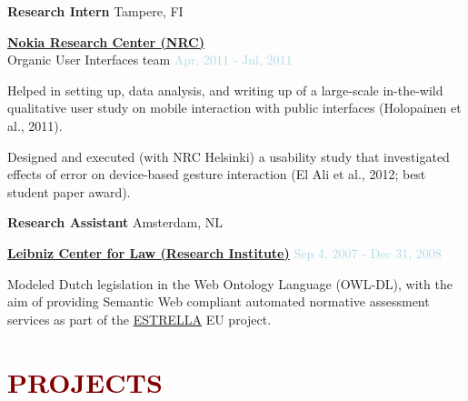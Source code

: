 \documentclass{article}
\newenvironment{outerlist}[1][\enskip\textbullet]%
        {\begin{enumerate}[#1]}{\end{enumerate}%
         \vspace{-.6\baselineskip}}
\newenvironment{innerlist}[1][\enskip\textbullet]%
        {\begin{compactenum}[#1]}{\end{compactenum}}
\begin{document}
\medskip
\textbf{Research Intern}
 \hfill {Tampere, FI}   

\begin{outerlist}

\item[] \href{http://research.nokia.com/}{\textbf{Nokia Research Center (NRC)}} \\ Organic User Interfaces team%
 	   \hfill {\textcolor{lightblue}{Apr, 2011 - Jul, 2011}}
	   
\medskip

\begin{innerlist}[-]

\item Helped in setting up, data analysis, and writing up of a large-scale in-the-wild qualitative user study on mobile interaction with public interfaces (Holopainen et al., 2011).
\item Designed and executed (with NRC Helsinki) a usability study that investigated effects of error on device-based gesture interaction (El Ali et al., 2012; best student paper award).

\end{innerlist}

\end{outerlist}



\medskip

\textbf{Research Assistant}
 \hfill {Amsterdam, NL}
\begin{outerlist}

\item[]  \href{http://www.leibnizcenter.org/}{\textbf{Leibniz Center for Law (Research Institute)}} \hfill {\textcolor{lightblue}{Sep 4, 2007 - Dec 31, 2008}}

	   \medskip

\begin{innerlist}[-]

\item Modeled Dutch legislation in the Web Ontology Language (OWL-DL), with the aim of providing Semantic Web compliant automated normative assessment services as part of the \href{http://www.estrellaproject.org/}{ESTRELLA} EU project.
\end{innerlist}

\end{outerlist}


\section*{\textcolor{maroon}{\normalsize PROJECTS}} 
\end{document}
